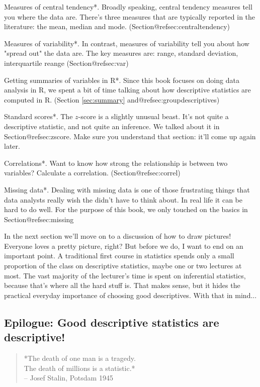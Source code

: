 \item *Measures of central tendency*. Broadly speaking, central tendency measures tell you where the data are. There's three measures that are typically reported in the literature: the mean, median and mode. (Section@refsec:centraltendency)
\item *Measures of variability*. In contrast, measures of variability tell you about how "spread out" the data are. The key measures are: range, standard deviation, interquartile reange (Section@refsec:var)
\item *Getting summaries of variables in R*. Since this book focuses on doing data analysis in R, we spent a bit of time talking about how descriptive statistics are computed in R. (Section \ref{sec:summary} and@refsec:groupdescriptives)
\item *Standard scores*. The $z$-score is a slightly unusual beast. It's not quite a descriptive statistic, and not quite an inference. We talked about it in Section@refsec:zscore. Make sure you understand that section: it'll come up again later. 
\item *Correlations*. Want to know how strong the relationship is between two variables? Calculate a correlation. (Section@refsec:correl)
\item *Missing data*. Dealing with missing data is one of those frustrating things that data analysts really wish the didn't have to think about. In real life it can be hard to do well. For the purpose of this book, we only touched on the basics in Section@refsec:missing

In the next section we'll move on to a discussion of how to draw pictures! Everyone loves a pretty picture, right? But before we do, I want to end on an important point. A traditional first course in statistics spends only a small proportion of the class on descriptive statistics, maybe one or two lectures at most. The vast majority of the lecturer's time is spent on inferential statistics, because that's where all the hard stuff is. That makes sense, but it hides the practical everyday importance of choosing good descriptives. With that in mind...

\subsection{Epilogue: Good descriptive statistics are descriptive!}

\begin{quote}
*The death of one man is a tragedy.\\  The death of millions is a statistic.*\\
\hspace*{2cm} -- Josef Stalin, Potsdam 1945
\end{quote}

